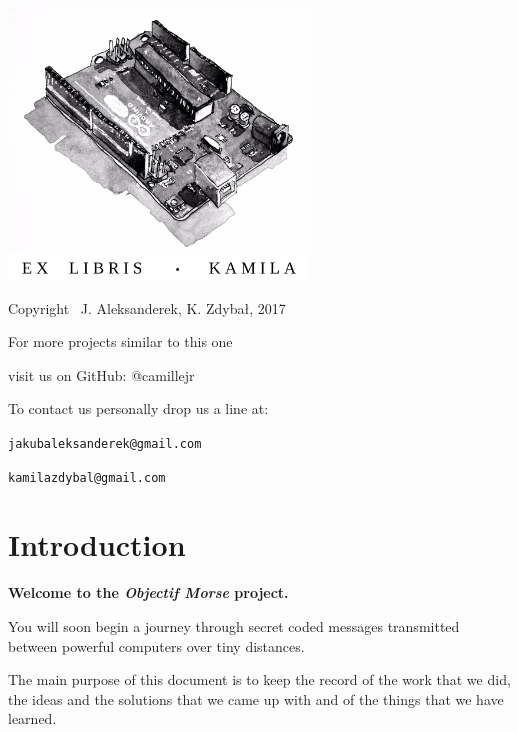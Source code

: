\documentclass[12pt]{report}
\begin{document}
\thispagestyle{empty}
\begin{center}
    
\vspace*{4cm}

\includegraphics[width = 80mm]{arduino_dwg.jpg}

\vspace*{2cm}

Copyright \textcopyright \, J. Aleksanderek, K. Zdybał, 2017

For more projects similar to this one

visit us on GitHub: @camillejr

To contact us personally drop us a line at:

\verb|jakubaleksanderek@gmail.com|

\verb|kamilazdybal@gmail.com|

\end{center}
\newpage




\setlength{\parindent}{0cm}
\clearpage

\tableofcontents

\setlength{\parskip}{1em}
\renewcommand{\baselinestretch}{1.0}

\chapter{Introduction}\label{chap:intro}

\textbf{Welcome to the \textit{Objectif Morse} project.} 

You will soon begin a journey through secret coded messages transmitted between powerful computers over tiny distances.

The main purpose of this document is to keep the record of the work that we did, the ideas and the solutions that we came up with and of the things that we have learned.
\end{document}
